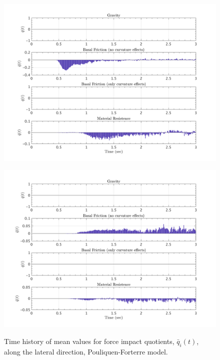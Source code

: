 \documentclass{article}
\begin{document}
\begin{figure}[H]
        \begin{minipage}[b]{0.5\linewidth}
                \centering
                \includegraphics[width=1\textwidth]{InclinedPlane/LocalRecords/ContribF15_P_y.png}
                \label{fig:Ramp-Py3}
        \end{minipage}
        \begin{minipage}[b]{0.5\linewidth}
                \centering
                \includegraphics[width=1\textwidth]{InclinedPlane/LocalRecords/ContribF17_P_y.png}
                \label{fig:Ramp-Py4}
        \end{minipage}
        \caption{Time history of mean values for force impact quotients, $\bar{q}_i(t)$, along the lateral direction, Pouliquen-Forterre model.}
        \label{fig:Ramp-Py}
\end{figure}
\end{document}
